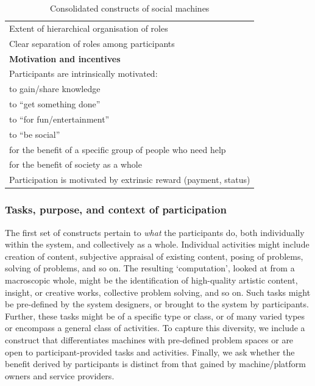 \documentclass{sig-alternate}
\begin{document}
\begin{table}[htb]
\begin{center}
\begin{scriptsize}
\begin{tabular}{|p{8cm}|}
Extent of hierarchical organisation of roles \\
Clear separation of roles among participants \\
\hline
{\bf Motivation and incentives} \\
\hline
Participants are intrinsically motivated:\\
\hspace{1cm} to gain/share knowledge \\
\hspace{1cm} to ``get something done'' \\
\hspace{1cm} to ``for fun/entertainment''\\
\hspace{1cm} to ``be social'' \\
\hspace{1cm} for the benefit of a specific group of people who need help \\
\hspace{1cm} for the benefit of society as a whole \\
Participation is motivated by extrinsic reward (payment, status) \\
\hline

\end{tabular}
\end{scriptsize}
\end{center}
\caption{Consolidated constructs of social machines} \label{table:constructs}
\end{table}

\subsubsection{Tasks, purpose, and context of participation}
The first set of constructs pertain to \emph{what} the participants
do, both individually within the system, and collectively as a whole.
Individual activities might include creation of content, subjective
appraisal of existing content, posing of problems, solving of
problems, and so on. The resulting `computation', looked at from a
macroscopic whole, might be the identification of high-quality
artistic content, insight, or creative works, collective problem
solving, and so on. Such tasks might be pre-defined by the system
designers, or brought to the system by participants. Further, these
tasks might be of a specific type or class, or of many varied types or
encompass a general class of activities. To capture this diversity,
we include a construct that differentiates machines with pre-defined problem spaces or are open to participant-provided tasks and activities. Finally, we ask whether the benefit derived by
participants is distinct from that gained by machine/platform owners
and service providers.
\end{document}
